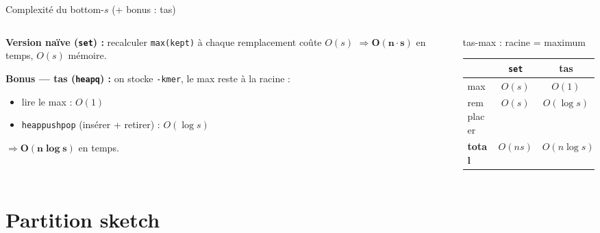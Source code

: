 \documentclass[aspectratio=169,11pt]{beamer}
\begin{document}
\begin{frame}{Complexité du bottom-$s$ \;(+ bonus : tas)}
  \begin{columns}[T]
    \begin{column}{0.54\textwidth}
      \footnotesize
      \textbf{Version naïve (\texttt{set}) :} recalculer \texttt{max(kept)} à chaque
      remplacement coûte $O(s)$ $\Rightarrow \mathbf{O(n\cdot s)}$ en temps, $O(s)$ mémoire.
      \smallskip

      \textbf{Bonus — tas (\texttt{heapq}) :} on stocke \texttt{-kmer}, le max reste
      à la racine :
      \begin{itemize}
        \item lire le max : $O(1)$
        \item \texttt{heappushpop} (insérer + retirer) : $O(\log s)$
      \end{itemize}
      $\Rightarrow \mathbf{O(n\log s)}$ en temps.
    \end{column}
    \begin{column}{0.46\textwidth}
      \centering

      {\scriptsize\color{cGray} tas-max : racine = maximum}

      \smallskip
      {\scriptsize
      \begin{tabular}{lcc}
        \toprule
         & \texttt{set} & tas \\
        \midrule
        max     & $O(s)$ & $O(1)$ \\
        remplacer & $O(s)$ & $O(\log s)$ \\
        \midrule
        \textbf{total} & $O(ns)$ & $O(n\log s)$ \\
        \bottomrule
      \end{tabular}}
    \end{column}
  \end{columns}
\end{frame}

\section{Partition sketch}
\end{document}
